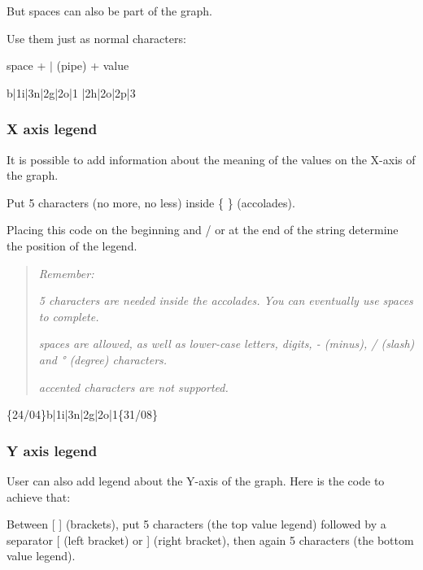 But spaces can also be part of the graph.

Use them just as normal characters\+:

{\ttfamily space} + {\ttfamily $\vert$} (pipe) + {\ttfamily value}


\begin{DoxyPre}{\ttfamily b|1i|3n|2g|2o|1 |2h|2o|2p|3}\end{DoxyPre}




\subsubsection*{X axis legend}

It is possible to add information about the meaning of the values on the X-\/axis of the graph.

Put 5 characters (no more, no less) inside {\ttfamily \{ \}} (accolades).

Placing this code on the beginning and / or at the end of the string determine the position of the legend.

\begin{quote}
{\itshape Remember\+:}


\begin{DoxyItemize}
\item {\itshape 5 characters are needed inside the accolades. You can eventually use spaces to complete.}
\item {\itshape spaces are allowed, as well as lower-\/case letters, digits, {\ttfamily -\/} (minus), {\ttfamily /} (slash) and {\ttfamily °} (degree) characters.}
\item {\itshape accented characters are not supported.} 
\end{DoxyItemize}\end{quote}



\begin{DoxyPre}{\ttfamily \{24/04\}b|1i|3n|2g|2o|1\{31/08\}}\end{DoxyPre}




\subsubsection*{Y axis legend}

User can also add legend about the Y-\/axis of the graph. Here is the code to achieve that\+:

Between {\ttfamily \mbox{[} \mbox{]}} (brackets), put 5 characters (the top value legend) followed by a separator {\ttfamily \mbox{[}} (left bracket) or {\ttfamily \mbox{]}} (right bracket), then again 5 characters (the bottom value legend).


